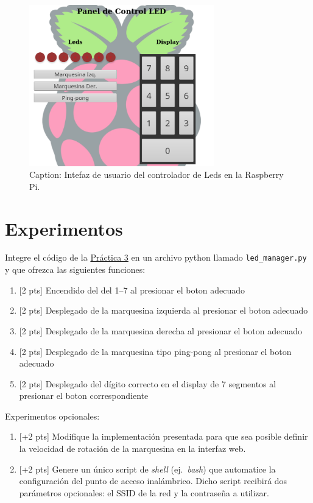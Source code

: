 \documentclass[letterpaper,10.5pt]{article}
\newcommand{\prevpract}{%
	\href{https://github.com/kyordhel/FSEm/tree/master/practica03}{Práctica 3}%
	\xspace{}%
}
\begin{document}
\begin{figure}[H]
	\centering
	\includegraphics[height=7cm,keepaspectratio]{img/screenshot-ui.png}
	\caption{Caption: Intefaz de usuario del controlador de Leds en la Raspberry Pi.}
	\label{fig:hello-world} %
\end{figure}


\section{Experimentos}%
\label{sec:experiments}

Integre el código de la \prevpract{} en un archivo python llamado \texttt{led\_manager.py} y que ofrezca las siguientes funciones:
\begin{enumerate}
	\item{} [2 pts] Encendido del del 1--7 al presionar el boton adecuado
	\item{} [2 pts] Desplegado de la marquesina izquierda al presionar el boton adecuado
	\item{} [2 pts] Desplegado de la marquesina derecha al presionar el boton adecuado
	\item{} [2 pts] Desplegado de la marquesina tipo ping-pong al presionar el boton adecuado
	\item{} [2 pts] Desplegado del dígito correcto en el display de 7 segmentos al presionar el boton correspondiente
\end{enumerate}

Experimentos opcionales:
\begin{enumerate}
	\item{} [+2 pts] Modifique la implementación presentada para que sea posible definir la velocidad de rotación de la marquesina en la interfaz web.
	\item{} [+2 pts] Genere un único script de \emph{shell} (ej.~\emph{bash}) que automatice la configuración del punto de acceso inalámbrico.
	Dicho script recibirá dos parámetros opcionales: el SSID de la red y la contraseña a utilizar.
\end{enumerate}
\end{document}
